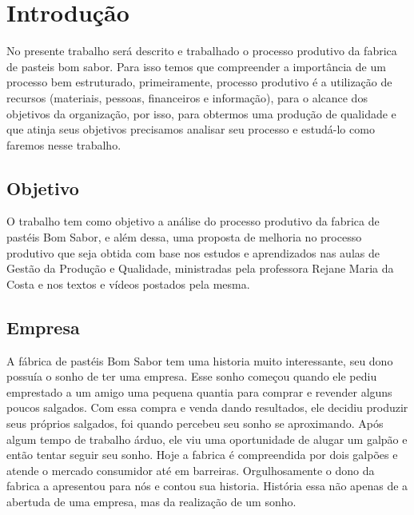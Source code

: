 \chapter[Introdução]{Introdução}

No presente trabalho será descrito e trabalhado o processo produtivo da fabrica de pasteis bom sabor. Para isso temos que compreender a importância de um processo bem estruturado, primeiramente, processo produtivo é a utilização de recursos (materiais, pessoas, financeiros e informação), para o alcance dos objetivos da organização, por isso, para obtermos uma produção de qualidade e que atinja seus objetivos precisamos analisar seu processo e estudá-lo como faremos nesse trabalho.

\section{Objetivo}

O trabalho tem como objetivo a análise do processo produtivo da fabrica de pastéis Bom Sabor, e além dessa, uma proposta de melhoria no processo produtivo que seja obtida com base nos estudos e aprendizados nas aulas de Gestão da Produção e Qualidade, ministradas pela professora Rejane Maria da Costa e nos textos e vídeos postados pela mesma.

\section{Empresa}

A fábrica de pastéis Bom Sabor tem uma historia muito interessante, seu dono possuía o sonho de ter uma empresa. Esse sonho começou quando ele pediu emprestado a um amigo uma pequena quantia para comprar e revender alguns poucos salgados. Com essa compra e venda dando resultados, ele decidiu produzir seus próprios salgados, foi quando percebeu seu sonho se aproximando. Após algum tempo de trabalho árduo, ele viu uma oportunidade de alugar um galpão e então tentar seguir seu sonho. Hoje a fabrica é compreendida por dois galpões e atende o mercado consumidor até em barreiras. Orgulhosamente o dono da fabrica a apresentou para nós e contou sua historia. História essa não apenas de a abertuda de uma empresa, mas da realização de um sonho.